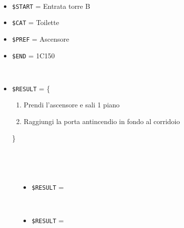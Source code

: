\documentclass[../../Sperimentazione.tex]{subfiles}
\begin{document}
			\begin{tcolorbox}[fonttitle=\bfseries, 
								adjusted title={\Large Prova 2A.1}, 
								breakable, 
								sharp corners=south,
								colback=white, 
								colframe=white!60!black]
								
				\begin{description}[leftmargin=0.7cm,labelwidth=!]
				
					\item[Input] \ \par 
        				\begin{itemize}
        					\item \verb|$START| = Entrata torre B
							\item \verb|$CAT| = Toilette
							\item \verb|$PREF| = Ascensore
        					\item \verb|$END| = 1C150
        				\end{itemize}
        				
        			\tcbline 
        				
        			\item[Output atteso] \ \par
        				\begin{itemize}
        					\item \verb|$RESULT| = \{
        						\begin{enumerate}
        							\item Prendi l'ascensore e sali 1 piano
									\item Raggiungi la porta antincendio in fondo al corridoio
        						\end{enumerate}
        					\}
        				\end{itemize}

					\tcbline        				
        				
        			\item[Output riscontrato] \ \par
        				\begin{description}
        				
        					\item[\dispositivoA] \ \par
        					\begin{itemize}
        						\item \verb|$RESULT| = \ns
        					\end{itemize}      					
        					
        					\item[\dispositivoB] \ \par
        					\begin{itemize}
        						\item \verb|$RESULT| = \ns
        					\end{itemize}
        					

\end{description}
\end{description}
\end{tcolorbox}
\end{document}
